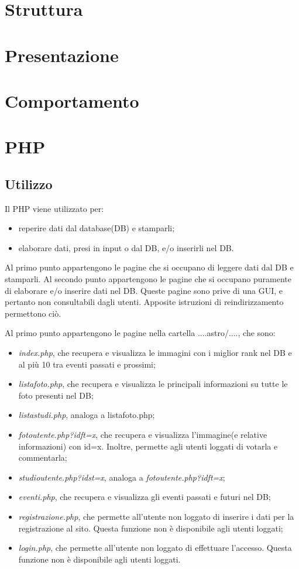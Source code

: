 \section{Struttura}
\section{Presentazione}
\section{Comportamento}
\section{PHP}
\subsection{Utilizzo}
Il PHP viene utilizzato per:
 \begin{itemize}
 	\item reperire dati dal database(DB) e stamparli;
 	\item elaborare dati, presi in input o dal DB, e/o inserirli nel DB.
 \end{itemize} 
 
 Al primo punto appartengono le pagine che si occupano di leggere dati dal DB e stamparli.
 Al secondo punto appartengono le pagine che si occupano puramente di elaborare e/o inserire dati nel DB. Queste pagine sono prive di una GUI, e pertanto non consultabili dagli utenti. Apposite istruzioni di reindirizzamento permettono ciò.
 
 Al primo punto appartengono le pagine nella cartella ....astro/...., che sono:
 \begin{itemize}
 	\item \textit{index.php}, che recupera e visualizza le immagini con i miglior rank nel DB e al più 10 tra eventi passati e prossimi;
 	\item \textit{listafoto.php}, che recupera e visualizza le principali informazioni su tutte le foto presenti nel DB;
 	\item \textit{listastudi.php}, analoga a listafoto.php;
 	\item \textit{fotoutente.php?idft=x}, che recupera e visualizza l'immagine(e relative informazioni) con id=x. Inoltre, permette agli utenti loggati di votarla e commentarla;
 	\item \textit{studioutente.php?idst=x}, analoga a \textit{fotoutente.php?idft=x};
 	\item \textit{eventi.php}, che recupera e visualizza gli eventi passati e futuri nel DB;
 	\item \textit{registrazione.php}, che permette all'utente non loggato di inserire i dati per la registrazione al sito. Questa funzione non è disponibile agli utenti loggati;
 	\item \textit{login.php}, che permette all'utente non loggato di effettuare l'accesso. Questa funzione non è disponibile agli utenti loggati.
 \end{itemize}
 
